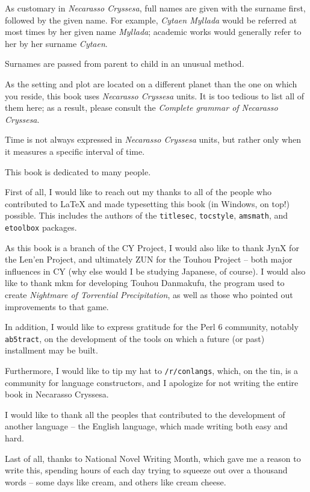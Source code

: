 
As customary in \emph{Necarasso Cryssesa}, full names are given with the surname first, followed by the given name. For example, \emph{Cytaen Myllada} would be referred at most times by her given name \emph{Myllada}; academic works would generally refer to her by her surname \emph{Cytaen}.

Surnames are passed from parent to child in an unusual method.

\centeredstars

As the setting and plot are located on a different planet than the one on which you reside, this book uses \emph{Necarasso Cryssesa} units. It is too tedious to list all of them here; as a result, please consult the \emph{Complete grammar of Necarasso Cryssesa}.

Time is not always expressed in \emph{Necarasso Cryssesa} units, but rather only when it measures a specific interval of time.


This book is dedicated to many people.

First of all, I would like to reach out my thanks to all of the people who contributed to \LaTeX{} and made typesetting this book (in Windows, on top!) possible. This includes the authors of the \texttt{titlesec}, \texttt{tocstyle}, \texttt{amsmath}, and \texttt{etoolbox} packages.

As this book is a branch of the CY Project, I would also like to thank JynX for the Len'en Project, and ultimately ZUN for the Touhou Project -- both major influences in CY (why else would I be studying Japanese, of course). I would also like to thank mkm for developing Touhou Danmakufu, the program used to create \emph{Nightmare of Torrential Precipitation}, as well as those who pointed out improvements to that game.

In addition, I would like to express gratitude for the Perl 6 community, notably \texttt{ab5tract}, on the development of the tools on which a future (or past) installment may be built.

Furthermore, I would like to tip my hat to \texttt{/r/conlangs}, which, on the tin, is a community for language constructors, and I apologize for not writing the entire book in Necarasso Cryssesa.

I would like to thank all the peoples that contributed to the development of another language -- the English language, which made writing both easy and hard.

Last of all, thanks to National Novel Writing Month, which gave me a reason to write this, spending hours of each day trying to squeeze out over a thousand words -- some days like cream, and others like cream cheese.